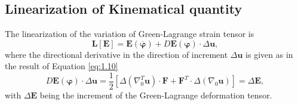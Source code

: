 \documentclass[11pt,a4paper,final]{article}
\begin{document}
\subsection{\textbf{Linearization of Kinematical quantity}}
The linearization of the variation of Green-Lagrange strain tensor is 
\begin{equation}
\mathbf{L}\left[ \mathbf{E} \right] = \mathbf{E}(\overline{\bm{\varphi}}) + D \mathbf{E}(\bm{\varphi}) \cdot \Delta \mathbf{u},
\label{eq:1.17}
\end{equation}
where the directional derivative in the direction of increment $\Delta \mathbf{u}$ is given as in the result of Equation \eqref{eq:1.10}
\begin{equation}
D \mathbf{E}(\bm{\varphi}) \cdot \Delta\mathbf{u} = \dfrac{1}{2} \left[ \Delta(\nabla_0^T \mathbf{u}) \cdot \mathbf{F} + \mathbf{F}^T \cdot \Delta(\nabla_0 \mathbf{u}) \right] = \Delta \mathbf{E},
\label{eq:1.18}
\end{equation}
with $\Delta\mathbf{E}$ being the increment of the Green-Lagrange deformation tensor.
\end{document}
